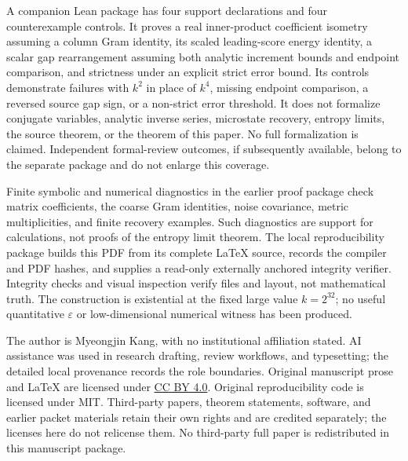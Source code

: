 \documentclass[11pt]{article}
\theoremstyle{definition}\newtheorem{definition}[theorem]{Definition}
\theoremstyle{remark}\newtheorem{remark}[theorem]{Remark}
\newcommand{\eps}{\varepsilon}\newcommand{\id}{\mathrm{id}}
\begin{document}
A companion Lean package has four support declarations and four
counterexample controls. It proves a real inner-product coefficient
isometry assuming a column Gram identity, its scaled leading-score
energy identity, a scalar gap rearrangement assuming both analytic
increment bounds and endpoint comparison, and strictness under an
explicit strict error bound. Its controls demonstrate failures with
$k^2$ in place of $k^4$, missing endpoint comparison, a reversed source
gap sign, or a non-strict error threshold. It does not formalize
conjugate variables, analytic inverse series, microstate recovery,
entropy limits, the source theorem, or the theorem of this paper.
No full formalization is claimed. Independent formal-review outcomes,
if subsequently available, belong to the separate package and do not
enlarge this coverage.

Finite symbolic and numerical diagnostics in the earlier proof package
check matrix coefficients, the coarse Gram identities, noise covariance,
metric multiplicities, and finite recovery examples. Such diagnostics
are support for calculations, not proofs of the entropy limit theorem.
The local reproducibility package builds this PDF from its complete
LaTeX source, records the compiler and PDF hashes, and supplies a
read-only externally anchored integrity verifier. Integrity checks and
visual inspection verify files and layout, not mathematical truth.
The construction is existential at the fixed large value $k=2^{32}$;
no useful quantitative $\eps$ or low-dimensional numerical witness
has been produced.

The author is Myeongjin Kang, with no institutional affiliation stated.
AI assistance was used in research drafting, review workflows, and
typesetting; the detailed local provenance records the role boundaries.
Original manuscript prose and LaTeX are licensed under
\href{https://creativecommons.org/licenses/by/4.0/}{CC BY 4.0}.
Original reproducibility code is licensed under MIT. Third-party
papers, theorem statements, software, and earlier packet materials
retain their own rights and are credited separately; the licenses here
do not relicense them. No third-party full paper is redistributed in
this manuscript package.
\end{document}
